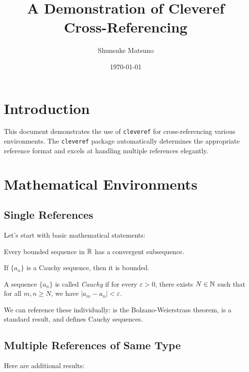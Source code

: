 \documentclass[11pt]{article}
\title{A Demonstration of Cleveref Cross-Referencing}
\author{Shunsuke Matsuno}
\date{\today}
\begin{document}
\maketitle

\section{Introduction}

This document demonstrates the use of \texttt{cleveref} for cross-referencing various environments. The \texttt{cleveref} package automatically determines the appropriate reference format and excels at handling multiple references elegantly.

\section{Mathematical Environments}

\subsection{Single References}

Let's start with basic mathematical statements:

\begin{theorem}\label{thm:fundamental}
Every bounded sequence in $\mathbb{R}$ has a convergent subsequence.
\end{theorem}

\begin{lemma}\label{lem:helper}
If $\{a_n\}$ is a Cauchy sequence, then it is bounded.
\end{lemma}

\begin{definition}\label{def:cauchy}
A sequence $\{a_n\}$ is called \emph{Cauchy} if for every $\varepsilon > 0$, there exists $N \in \mathbb{N}$ such that for all $m, n \geq N$, we have $|a_m - a_n| < \varepsilon$.
\end{definition}

We can reference these individually:  is the Bolzano-Weierstrass theorem,  is a standard result, and  defines Cauchy sequences.

\subsection{Multiple References of Same Type}

Here are additional results:
\end{document}
